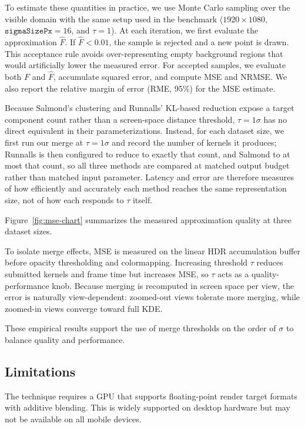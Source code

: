 \documentclass[10pt,conference]{IEEEtran}
\begin{document}
To estimate these quantities in practice, we use Monte Carlo sampling over the visible domain with the same setup used in the benchmark ($1920\times1080$, $\texttt{sigmaSizePx}=16$, and $\tau=1$). At each iteration, we first evaluate the approximation $\hat{F}$. If $\hat{F}<0.01$, the sample is rejected and a new point is drawn. This acceptance rule avoids over-representing empty background regions that would artificially lower the measured error. For accepted samples, we evaluate both $F$ and $\hat{F}$, accumulate squared error, and compute MSE and NRMSE. We also report the relative margin of error (RME, 95\%) for the MSE estimate.

Because Salmond's clustering and Runnalls' KL-based reduction expose a target component count rather than a screen-space distance threshold, $\tau=1\sigma$ has no direct equivalent in their parameterizations. Instead, for each dataset size, we first run our merge at $\tau=1\sigma$ and record the number of kernels it produces; Runnalls is then configured to reduce to exactly that count, and Salmond to at most that count, so all three methods are compared at matched output budget rather than matched input parameter. Latency and error are therefore measures of how efficiently and accurately each method reaches the same representation size, not of how each responds to $\tau$ itself.

Figure~\ref{fig:mse-chart} summarizes the measured approximation quality at three dataset sizes.


To isolate merge effects, MSE is measured on the linear HDR accumulation buffer before opacity thresholding and colormapping. Increasing threshold $\tau$ reduces submitted kernels and frame time but increases MSE, so $\tau$ acts as a quality-performance knob. Because merging is recomputed in screen space per view, the error is naturally view-dependent: zoomed-out views tolerate more merging, while zoomed-in views converge toward full KDE.

These empirical results support the use of merge thresholds on the order of $\sigma$ to balance quality and performance.

\subsection{Limitations}

The technique requires a GPU that supports floating-point render target formats with additive blending. This is widely supported on desktop hardware but may not be available on all mobile devices.
\end{document}
